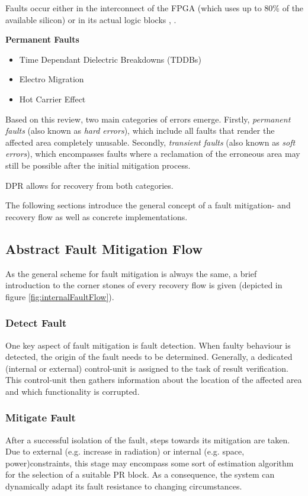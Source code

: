 Faults occur either in the interconnect of the \gls{FPGA} (which uses up to 80\% of the available silicon) or in its actual logic blocks \cite{alkady_fault-tolerant_2014}, \cite{jing_huang_routability_2004}.
\par
\textbf{Permanent Faults}
\begin{itemize}
    \item Time Dependant Dielectric Breakdowns (TDDBs)
    \item Electro Migration
    \item Hot Carrier Effect
\end{itemize}

Based on this review, two main categories of errors emerge.
Firstly, \textit{permanent faults} (also known as \textit{hard errors}), which include all faults that render the affected area completely unusable. 
Secondly, \textit{transient faults} (also known as \textit{soft errors}), which encompasses faults where a reclamation of the erroneous area may still be possible after the initial mitigation process.

\gls{DPR} allows for recovery from both categories.

The following sections introduce the general concept of a fault mitigation- and recovery flow as well as concrete implementations. 

\subsection{Abstract Fault Mitigation Flow}\label{AbstractFaultMitigationFlow}
As the general scheme for fault mitigation is always the same, a brief introduction to the corner stones of every recovery flow is given (depicted in figure \ref{fig:internalFaultFlow}). 

\subsubsection{Detect Fault}
    One key aspect of fault mitigation is fault detection. 
    When faulty behaviour is detected, the origin of the fault needs to be determined.
    Generally, a dedicated (internal or external) control-unit is assigned to the task of result verification.
    This control-unit then gathers information about the location of the affected area and which functionality is corrupted.
\subsubsection{Mitigate Fault}
    After a successful isolation of the fault, steps towards its mitigation are taken.
    Due to external (e.g. increase in radiation) or internal (e.g. space, power)constraints, this stage may encompass some sort of estimation algorithm for the selection of a suitable \gls{PR} block.
    As a consequence, the system can dynamically adapt its fault resistance to changing circumstances.
